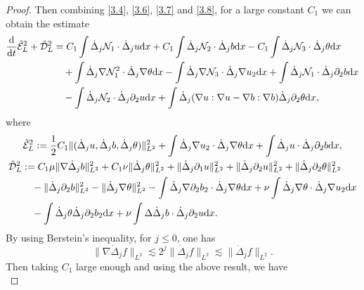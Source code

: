 \documentclass[reqno]{amsart}
\begin{document}
\begin{proof}
Then combining \eqref{3.4}, \eqref{3.6}, \eqref{3.7} and \eqref{3.8}, for a large
constant $C_1$ we can obtain the estimate
\begin{equation}\label{3.9}
\begin{aligned}
\frac{\rm d}{{\rm d}t}\tilde{\mathcal{E}}_L^2+\tilde{\mathcal{D}}_L^2
&=C_1\int\dot{\Delta}_j \mathcal{N}_1\cdot \dot{\Delta}_ju{\rm d}x+C_1\int\dot{\Delta}_j \mathcal{N}_2\cdot \dot{\Delta}_jb{\rm d}x-C_1\int\dot{\Delta}_j \mathcal{N}_3\cdot \dot{\Delta}_j\theta{\rm d}x \\
&\quad +\int\dot{\Delta}_j\nabla \mathcal{N}_1^2\cdot\dot{\Delta}_j\nabla\theta{\rm d}x-\int\dot{\Delta}_j\nabla\mathcal{N}_3\cdot\dot{\Delta}_j\nabla u_2{\rm d}x+\int\dot{\Delta}_j \mathcal{N}_1\cdot\dot{\Delta}_j\partial_2b{\rm d}x \\
&\quad -\int\dot{\Delta}_j\mathcal{N}_2\cdot\dot{\Delta}_j\partial_2 u{\rm d}x+\int\dot{\Delta}_j(\nabla u:\nabla u-\nabla b:\nabla b)\dot{\Delta}_j\partial_2\theta{\rm d}x,
\end{aligned}
\end{equation}
 where
 \begin{gather*}
 \tilde{\mathcal{E}}_L^2:=\frac{1}{2}C_1\|(\dot{\Delta}_ju,\dot{\Delta}_jb,
 \dot{\Delta}_j\theta)\|_{L^2}^2+\int\dot{\Delta}_j\nabla u_2\cdot\dot{\Delta}_j
 \nabla\theta{\rm d}x
 +\int\dot{\Delta}_j u\cdot\dot{\Delta}_j\partial_2b{\rm d}x,\\
\begin{aligned}
\tilde{\mathcal{D}}_L^2
&:= C_1\mu\|\nabla\dot{\Delta}_jb\|_{L^2}^2+C_1\nu\|\dot{\Delta}_j\theta\|_{L^2}^2+\|\dot{\Delta}_j\partial_1 u\|_{L^2}^2+\|\dot{\Delta}_j\partial_2 u\|_{L^2}^2+\|\dot{\Delta}_j\partial_2\theta\|_{L^2}^2 \\
&\quad -\|\dot{\Delta}_j\partial_2b\|_{L^2}^2-\|\dot{\Delta}_j\nabla \theta\|_{L^2}^2
 -\int\dot{\Delta}_j\nabla\partial_2b_2\cdot\dot{\Delta}_j\nabla\theta{\rm d}x
 +\nu\int\dot{\Delta}_j\nabla\theta\cdot\dot{\Delta}_j\nabla u_2{\rm d}x \\
&\quad -\int\dot{\Delta}_j\theta\dot{\Delta}_j\partial_2b_2{\rm d}x
 +\nu\int\Delta\dot{\Delta}_jb\cdot\dot{\Delta}_j\partial_2 u{\rm d}x.
\end{aligned}
\end{gather*}
By using Berstein's inequality, for $j\leqslant 0$, one has
\[
 \|\nabla\dot{\Delta}_jf\|_{L^2}\lesssim2^j\|\dot{\Delta}_jf\|_{L^2}
 \lesssim\|\dot{\Delta}_jf\|_{L^2}.
\]
Then taking $C_1$ large enough and using the above result, we have
 \begin{equation}\label{3.10}

\end{equation}
\end{proof}
\end{document}
